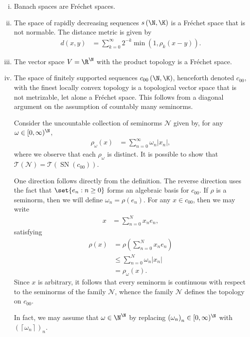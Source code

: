 \documentclass[10pt]{mypackage}
\begin{document}
\begin{example}\hfill
  \begin{enumerate}[(i)]
    \item Banach spaces are Fréchet spaces.
    \item The space of rapidly decreasing sequences $s\left( \N,\K \right)$ is a Fréchet space that is not normable. The distance metric is given by
      \begin{align*}
        d\left( x,y \right) &= \sum_{k=0}^{\infty} 2^{-k} \min\left( 1,\rho_k\left( x-y \right) \right).
      \end{align*}
    \item The vector space $V = \R^{\N}$ with the product topology is a Fréchet space.
    \item The space of finitely supported sequences $c_{00}\left( \N,\K \right)$, henceforth denoted $c_{00}$, with the finest locally convex topology is a topological vector space that is not metrizable, let alone a Fréchet space. This follows from a diagonal argument on the assumption of countably many seminorms.

      Consider the uncountable collection of seminorms $\mathcal{N}$ given by, for any $\omega\in [0,\infty)^{\N}$,
      \begin{align*}
        \rho_{\omega}(x) &= \sum_{n=0}^{\infty}\omega_n \left\vert x_n \right\vert,
      \end{align*}
      where we observe that each $\rho_{\omega}$ is distinct. It is possible to show that $ \mathcal{T}\left( \mathcal{N} \right) = \mathcal{T}\left( \operatorname{SN}\left( c_{00} \right) \right)$.

      One direction follows directly from the definition. The reverse direction uses the fact that $\set{e_n : n\geq 0}$ forms an algebraic basis for $c_00$. If $\rho$ is a seminorm, then we will define $\omega_n = \rho\left( e_n \right)$. For any $x\in c_{00}$, then we may write
      \begin{align*}
        x &= \sum_{n=0}^{N}x_ne_n,
      \end{align*}
      satisfying
      \begin{align*}
        \rho(x) &= \rho\left( \sum_{n=0}^{N} x_ne_n \right)\\
                &\leq \sum_{n=0}^{N} \omega_n \left\vert x_n \right\vert\\
                &= \rho_{\omega}\left( x \right).
      \end{align*}
      Since $x$ is arbitrary, it  follows that every seminorm is continuous with respect to the seminorms of the family $ \mathcal{N} $, whence the family $ \mathcal{N} $ defines the topology on $ c_{00} $.

      In fact, we may assume that $\omega\in \N^{\N}$ by replacing $\left( \omega_n \right)_n\in [0,\infty)^{\N}$ with $\left( \left\lceil \omega_n \right\rceil \right)_n$.
  \end{enumerate}
\end{example}
\end{document}
